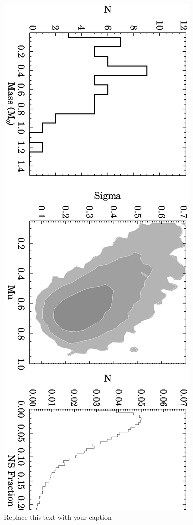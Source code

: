 \documentclass[letterpaper,12pt,preprint]{aastex}
\begin{document}
\begin{figure}[h!]
\begin{center}
\includegraphics[width=1\columnwidth]{ELM_post.eps}
\caption{Replace this text with your caption}
\end{center}
\end{figure}
\end{document}
